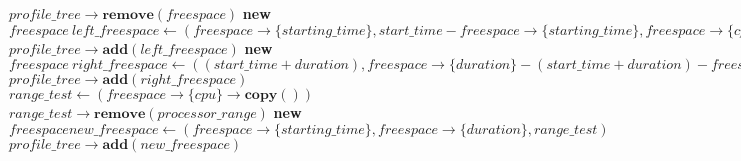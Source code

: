 \documentclass{report}
\begin{document}
\begin{algorithm}
\caption{Decoupage Freespace}\label{cut_freespace}
\begin{algorithmic}[1]
		\State $profile\_tree\rightarrow \textbf{remove}(freespace)$
		\State
			\State \textbf{new} $freespace\ left\_freespace\gets(freespace\rightarrow\{starting\_time\},start\_time - freespace\rightarrow\{starting\_time\}, freespace\rightarrow\{cpu\})$
			\State $profile\_tree\rightarrow \textbf{add}(left\_freespace)$
		\EndIf
		\State
			\State \textbf{new} $freespace\ right\_freespace\gets((start\_time + duration),freespace\rightarrow\{duration\} - (start\_time + duration) - freespace\rightarrow\{starting\_time\}, freespace\rightarrow\{cpu\})$
			\State $profile\_tree\rightarrow \textbf{add}(right\_freespace)$
		\EndIf
		\State
		\State $range\_test \gets (freespace\rightarrow\{cpu\}\rightarrow \textbf{copy}())$
		\State $range\_test\rightarrow \textbf{remove}(processor\_range)$
		\State		
			\State \textbf{new} $freespace new\_freespace\gets(freespace\rightarrow\{starting\_time\}, freespace\rightarrow\{duration\}, range\_test)$
			\State $profile\_tree\rightarrow \textbf{add}(new\_freespace)$
		\EndIf
		\State
	\EndIf
	\State
\EndFunction
\end{algorithmic}
\end{algorithm}
\end{document}
